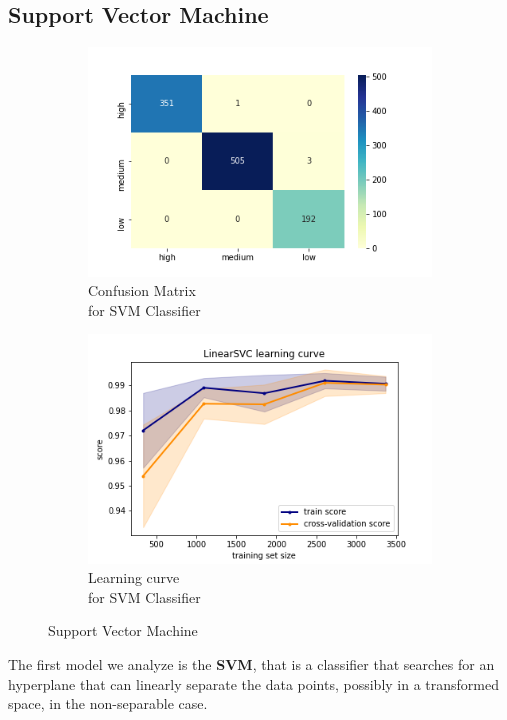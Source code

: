 \subsection{Support Vector Machine}
\begin{figure}[h!]
     \captionsetup{justification=centering}             
     \centering
     \begin{subfigure}{0.49\textwidth}
         \centering
         \captionsetup{type=figure}
         \includegraphics[scale=0.45]{img/classification/svm_confusion.png}
         \caption{Confusion Matrix \\ for SVM Classifier}
         \label{fig:svm_confusion}
     \end{subfigure}
     \begin{subfigure}{0.49\textwidth}
         \centering
         \includegraphics[scale=0.45]{img/classification/svm_lc.png}
         \caption{Learning curve \\ for SVM Classifier}
         \label{fig:svm_lc}
     \end{subfigure}
     \caption{Support Vector Machine}
    \label{fig:svm}
\end{figure}
The first model we analyze is the \textbf{SVM}, that is a classifier that searches for an hyperplane that can linearly separate the data points, possibly in a transformed space, in the non-separable case.

